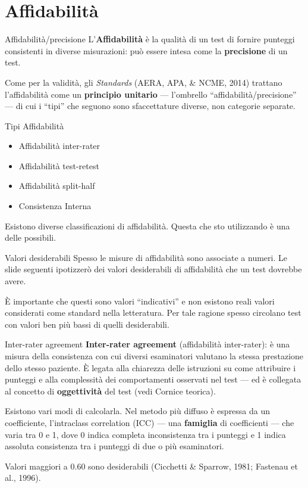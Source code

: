 \documentclass[
  ignorenonframetext,
]{beamer}
\providecommand{\tightlist}{%
  \setlength{\itemsep}{0pt}\setlength{\parskip}{0pt}}
\begin{document}
\section{Affidabilità}\label{affidabilituxe0}

\begin{frame}{Affidabilità/precisione}
\label{affidabilituxe0precisione}
L'\textbf{Affidabilità} è la qualità di un test di fornire punteggi
consistenti in diverse misurazioni: può essere intesa come la
\textbf{precisione} di un test.

Come per la validità, gli \emph{Standards} (AERA, APA, \& NCME, 2014)
trattano l'affidabilità come un \textbf{principio unitario} ---
l'ombrello ``affidabilità/precisione'' --- di cui i ``tipi'' che seguono
sono sfaccettature diverse, non categorie separate.
\end{frame}

\begin{frame}{Tipi Affidabilità}
\label{tipi-affidabilituxe0}
\begin{itemize}
\tightlist
\item
  Affidabilità inter-rater
\item
  Affidabilità test-retest
\item
  Affidabilità split-half
\item
  Consistenza Interna
\end{itemize}

Esistono diverse classificazioni di affidabilità. Questa che sto
utilizzando è una delle possibili.
\end{frame}

\begin{frame}{Valori desiderabili}
\label{valori-desiderabili}
Spesso le misure di affidabilità sono associate a numeri. Le slide
seguenti ipotizzerò dei valori desiderabili di affidabilità che un test
dovrebbe avere.

È importante che questi sono valori ``indicativi'' e non esistono reali
valori considerati come standard nella letteratura. Per tale ragione
spesso circolano test con valori ben più bassi di quelli desiderabili.
\end{frame}

\begin{frame}{Inter-rater agreement}
\label{inter-rater-agreement}
\textbf{Inter-rater agreement} (affidabilità inter-rater): è una misura
della consistenza con cui diversi esaminatori valutano la stessa
prestazione dello stesso paziente. È legata alla chiarezza delle
istruzioni su come attribuire i punteggi e alla complessità dei
comportamenti osservati nel test --- ed è collegata al concetto di
\textbf{oggettività} del test (vedi Cornice teorica).

Esistono vari modi di calcolarla. Nel metodo più diffuso è espressa da
un coefficiente, l'intraclass correlation (ICC) --- una
\textbf{famiglia} di coefficienti --- che varia tra 0 e 1, dove 0 indica
completa inconsistenza tra i punteggi e 1 indica assoluta consistenza
tra i punteggi di due o più esaminatori.

Valori maggiori a 0.60 sono desiderabili (Cicchetti \& Sparrow, 1981;
Fastenau et al., 1996).
\end{frame}
\end{document}
